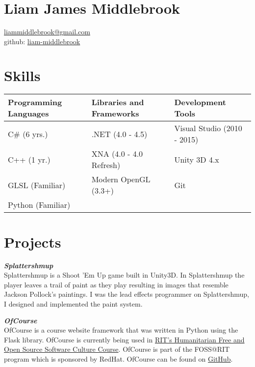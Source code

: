 \documentclass[line,margin]{res}
\begin{document}
\marginsize{.5in}{.5in}{1.0in}{.5in}

\section{Liam James Middlebrook}

\href{mailto:liammiddlebrook@gmail.com}{liammiddlebrook@gmail.com}\\
github: \href{https://github.com/liam-middlebrook}{liam-middlebrook}

\begin{resume}


\section{Skills}
\begin{table}[h]
\begin{tabular}{@{}lll@{}}
\toprule
Programming Languages & Libraries and Frameworks & Development Tools           \\ \midrule
C\# (6 yrs.)          & .NET (4.0 - 4.5)         & Visual Studio (2010 - 2015) \\
C++ (1 yr.)           & XNA (4.0 - 4.0 Refresh)  & Unity 3D 4.x                \\
GLSL (Familiar)       & Modern OpenGL (3.3+)     & Git                         \\
Python (Familiar)     &                          &                             \\ \bottomrule
\end{tabular}
\end{table}


\section{Projects}

{\textbf{\emph{Splattershmup}}}\\
Splattershmup is a Shoot 'Em Up game built in Unity3D. In Splattershmup the player leaves
a trail of paint as they play resulting in images that resemble Jackson Pollock's paintings.
I was the lead effects programmer on Splattershmup, I designed and implemented the paint system.

{\textbf{\emph{OfCourse}}}\\
OfCourse is a course website framework that was written in Python using the Flask library.
OfCourse is currently being used in \href{http://hfoss-fossrit.rhcloud.com}{RIT's Humanitarian
Free and Open Source Software Culture Course}. OfCourse is part of the FOSS@RIT
program which is sponsored by RedHat. OfCourse can be found on \href{https://github.com/ryansb/ofcourse}
{GitHub}.


\end{resume}
\end{document}
